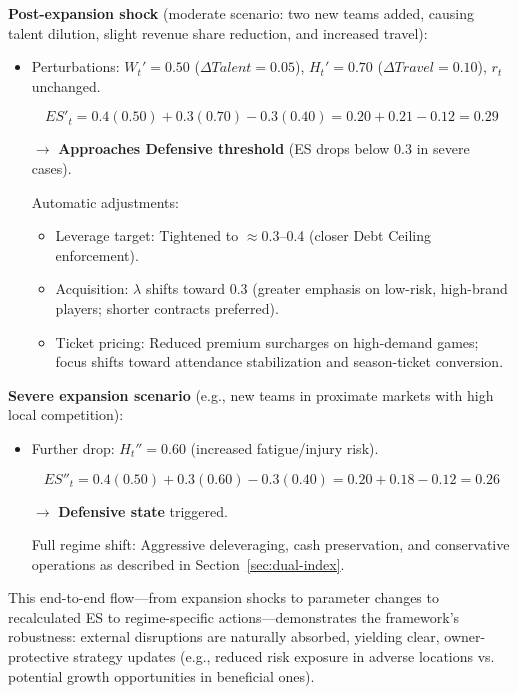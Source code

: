 \documentclass{mcmthesis}
\begin{document}
\textbf{Post-expansion shock} (moderate scenario: two new teams added, causing talent dilution, slight revenue share reduction, and increased travel):

\begin{itemize}
    \item Perturbations: $W_t' = 0.50$ ($\Delta Talent = 0.05$), $H_t' = 0.70$ ($\Delta Travel = 0.10$), $r_t$ unchanged.
    
    \[
    ES'_t = 0.4(0.50) + 0.3(0.70) - 0.3(0.40) = 0.20 + 0.21 - 0.12 = 0.29
    \]
    
    $\to$ \textbf{Approaches Defensive threshold} (ES drops below 0.3 in severe cases).
    
    Automatic adjustments:
    \begin{itemize}
        \item Leverage target: Tightened to $\approx 0.3$--0.4 (closer Debt Ceiling enforcement).
        \item Acquisition: $\lambda$ shifts toward 0.3 (greater emphasis on low-risk, high-brand players; shorter contracts preferred).
        \item Ticket pricing: Reduced premium surcharges on high-demand games; focus shifts toward attendance stabilization and season-ticket conversion.
    \end{itemize}
\end{itemize}

\textbf{Severe expansion scenario} (e.g., new teams in proximate markets with high local competition):

\begin{itemize}
    \item Further drop: $H_t'' = 0.60$ (increased fatigue/injury risk).
    
    \[
    ES''_t = 0.4(0.50) + 0.3(0.60) - 0.3(0.40) = 0.20 + 0.18 - 0.12 = 0.26
    \]
    
    $\to$ \textbf{Defensive state} triggered.
    
    Full regime shift: Aggressive deleveraging, cash preservation, and conservative operations as described in Section~\ref{sec:dual-index}.
\end{itemize}

This end-to-end flow—from expansion shocks to parameter changes to recalculated ES to regime-specific actions—demonstrates the framework's robustness: external disruptions are naturally absorbed, yielding clear, owner-protective strategy updates (e.g., reduced risk exposure in adverse locations vs. potential growth opportunities in beneficial ones).
\end{document}

